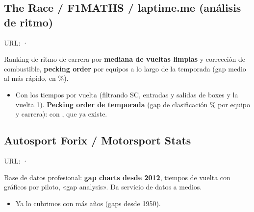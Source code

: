 \subsection{The Race / F1MATHS / laptime.me (análisis de ritmo)}

URL: \href{https://www.f1technical.net/news/28301}{} · \href{https://laptime.me/laptime-me-f1-2026-fuel-adjusted-pace-analysis-miami/}{}

Ranking de ritmo de carrera por \textbf{mediana de vueltas limpias} y corrección de combustible, \textbf{pecking order} por equipos a lo largo de la temporada (gap medio al más rápido, en \%).

\begin{itemize}
\item \si{} Con los tiempos por vuelta (filtrando SC, entradas y salidas de boxes y la vuelta 1). \textbf{Pecking order de temporada} (gap de clasificación \% por equipo y carrera): \si{} con , que ya existe.
\end{itemize}

\subsection{Autosport Forix / Motorsport Stats}

URL: \href{https://www.forix.com/}{} · \href{http://www.forix.com/8w/6thgear/index.html}{}

Base de datos profesional: \textbf{gap charts desde 2012}, tiempos de vuelta con gráficos por piloto, «gap analysis». Da servicio de datos a medios.

\begin{itemize}
\item \si{} Ya lo cubrimos con más años (gaps desde 1950).
\end{itemize}

